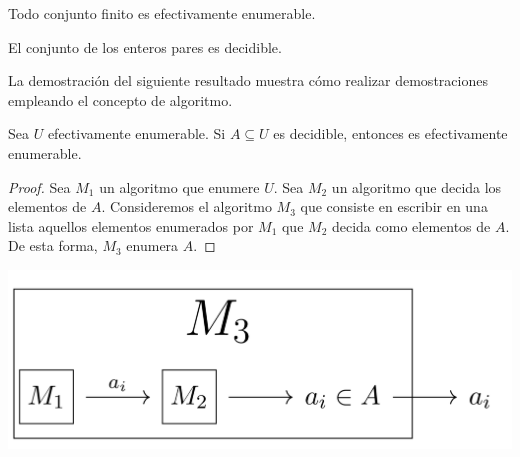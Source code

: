 \begin{example}
Todo conjunto finito es efectivamente enumerable. 
\end{example}

\begin{example}
El conjunto de los enteros pares es decidible.
\end{example}

La demostración del siguiente resultado muestra cómo realizar demostraciones empleando el concepto de algoritmo.

\begin{prop*}\label{numdec}
Sea $U$ efectivamente enumerable. Si $A\subseteq U$ es decidible, entonces es efectivamente enumerable.
\end{prop*}
\begin{proof}
Sea $M_1$ un algoritmo que enumere $U$. Sea $M_2$ un algoritmo que decida los elementos de $A$. Consideremos el algoritmo $M_3$ que consiste en escribir en una lista aquellos elementos enumerados por $M_1$ que $M_2$ decida como elementos de $A$. De esta forma, $M_3$ enumera $A$.
\end{proof}


\includegraphics[scale = 0.25]{figures/fig33.png}

